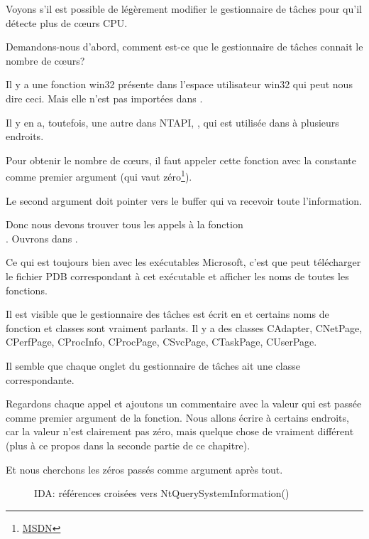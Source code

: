 
Voyons s'il est possible de légèrement modifier le gestionnaire de tâches pour qu'il
détecte plus de c\oe{}urs \ac{CPU}.


Demandons-nous d'abord, comment est-ce que le gestionnaire de tâches connait le nombre
de c\oe{}urs?

Il y a une fonction win32  présente dans l'espace utilisateur
win32 qui peut nous dire ceci.
Mais elle n'est pas importées dans .

Il y en a, toutefois, une autre dans \gls{NTAPI}, ,
qui est utilisée dans  à plusieurs endroits.

Pour obtenir le nombre de c\oe{}urs,  il faut appeler cette fonction avec la constante
 comme premier argument (qui vaut zéro\footnote{\href{http://go.yurichev.com/17251}{MSDN}}).

Le second argument doit pointer vers le buffer qui va recevoir toute l'information.

Donc nous devons trouver tous les appels à la fonction \\
.
Ouvrons  dans \IDA.

Ce qui est toujours bien avec les exécutables Microsoft, c'est que \IDA peut télécharger
le fichier \gls{PDB} correspondant à cet exécutable et afficher les noms de toutes
les fonctions. 

Il est visible que le gestionnaire des tâches est écrit en \Cpp et certains noms
de fonction et classes sont vraiment parlants.
Il y a des classes CAdapter, CNetPage, CPerfPage, CProcInfo, CProcPage, CSvcPage, 
CTaskPage, CUserPage.

Il semble que chaque onglet du gestionnaire de tâches ait une classe correspondante.

Regardons chaque appel et ajoutons un commentaire avec la valeur qui est passée comme
premier argument de la fonction.
Nous allons écrire  à certains endroits, car la valeur n'est clairement
pas zéro, mais quelque chose de vraiment différent (plus à ce propos dans la seconde
partie de ce chapitre).

Et nous cherchons les zéros passés comme argument après tout.

\begin{figure}[H]
\centering
{}
\caption{IDA: références croisées vers NtQuerySystemInformation()}
\end{figure}


